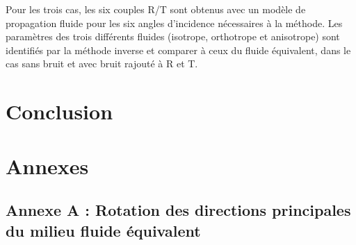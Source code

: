 \documentclass[12pt]{report}
\begin{document}
  
    Pour les trois cas, les six couples R/T sont obtenus avec un modèle de propagation fluide pour les six angles d'incidence nécessaires à la méthode. Les paramètres des trois différents fluides (isotrope, orthotrope et anisotrope) sont identifiés par la méthode inverse et comparer à ceux du fluide équivalent, dans le cas sans bruit et avec bruit rajouté à R et T. 
\chapter*{Conclusion}




\chapter*{Annexes}
\section*{Annexe A : Rotation des directions principales du milieu fluide équivalent}
\label{Ch_Ann_S_rot}
\end{document}
